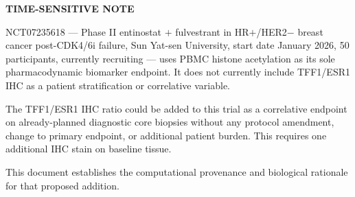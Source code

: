 \documentclass[12pt, a4paper]{article}
\begin{document}
\begin{center}
\colorbox{urgentbox}{
\begin{minipage}{0.88\textwidth}
\vspace{0.4em}
\textbf{TIME-SENSITIVE NOTE}

\medskip
NCT07235618 --- Phase II entinostat $+$ fulvestrant
in HR$+$/HER2$-$ breast cancer post-CDK4/6i failure,
Sun Yat-sen University, start date January 2026,
50 participants, currently recruiting --- uses PBMC
histone acetylation as its sole pharmacodynamic
biomarker endpoint. It does not currently include
TFF1/ESR1 IHC as a patient stratification or
correlative variable.

\medskip
The TFF1/ESR1 IHC ratio could be added to this trial
as a correlative endpoint on already-planned diagnostic
core biopsies without any protocol amendment, change
to primary endpoint, or additional patient burden.
This requires one additional IHC stain on baseline
tissue.

\medskip
This document establishes the computational provenance
and biological rationale for that proposed addition.
\vspace{0.4em}
\end{minipage}
}
\end{center}

\vspace{0.5em}
\end{document}
